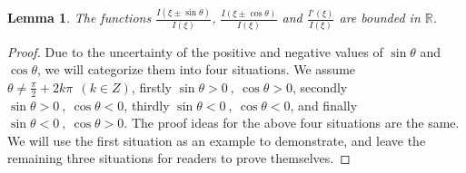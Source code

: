 \documentclass[10pt,a4paper]{amsart}
\newtheorem{lemma}{Lemma}
\begin{document}
\begin{lemma}\label{10}
The functions \(\displaystyle\frac{I(\xi\pm\sin\theta)}{I(\xi)}\), \(\displaystyle\frac{I(\xi\pm\cos\theta)}{I(\xi)}\) and \(\displaystyle\frac{I'(\xi)}{I(\xi)}\) are bounded in \(\mathbb{R}\).
\end{lemma}

\begin{proof}
Due to the uncertainty of the positive and negative values of  \(\sin\theta\) and \(\cos\theta\), we will categorize them into four situations. We assume  \(\theta\neq \displaystyle\frac{\pi}{2}+2k\pi~~(k\in  Z)\), firstly \(\sin\theta>0~,~\cos\theta>0\), secondly \(\sin\theta>0~,~\cos\theta<0\), thirdly \(\sin\theta<0~,~\cos\theta<0\), and finally \(\sin\theta<0~,~\cos\theta>0\). The proof ideas for the above four situations are the same. We will use the first situation as an example to demonstrate, and leave the remaining three situations for readers to prove themselves.


\end{proof}
\end{document}

